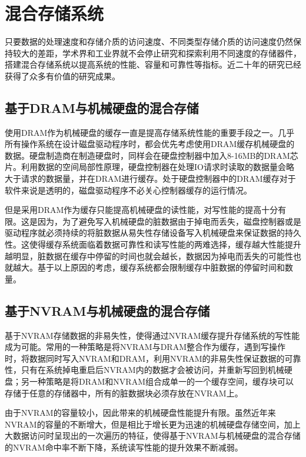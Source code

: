 \section{混合存储系统}
\label{sec:hybrid_storage}

只要数据的处理速度和存储介质的访问速度、不同类型存储介质的访问速度仍然保持较大的差距，学术界和工业界就不会停止研究和探索利用不同速度的存储器件，搭建混合存储系统以提高系统的性能、容量和可靠性等指标。近二十年的研究已经获得了众多有价值的研究成果。

\subsection{基于DRAM与机械硬盘的混合存储}

使用DRAM作为机械硬盘的缓存一直是提高存储系统性能的重要手段之一。几乎所有操作系统在设计磁盘驱动程序时，都会优先考虑使用DRAM缓存机械硬盘的数据。硬盘制造商在制造硬盘时，同样会在硬盘控制器中加入8-16MB的DRAM芯片。利用数据的空间局部性原理，硬盘控制器在处理IO请求时读取的数据量会略大于请求的数据量，并在DRAM进行缓存。处于硬盘控制器中的DRAM缓存对于软件来说是透明的，磁盘驱动程序不必关心控制器缓存的运行情况。

但是采用DRAM作为缓存只能提高机械硬盘的读性能，对写性能的提高十分有限。这是因为，为了避免写入机械硬盘的脏数据由于掉电而丢失，磁盘控制器或是驱动程序就必须持续的将脏数据从易失性存储设备写入机械硬盘来保证数据的持久性。这使得缓存系统面临着数据可靠性和读写性能的两难选择，缓存越大性能提升越明显，脏数据在缓存中停留的时间也就会越长，数据因为掉电而丢失的可能性也就越大。基于以上原因的考虑，缓存系统都会限制缓存中脏数据的停留时间和数量。

\subsection{基于NVRAM与机械硬盘的混合存储}

基于NVRAM存储数据的非易失性，使得通过NVRAM缓存提升存储系统的写性能成为可能。常用的一种策略是将NVRAM与DRAM整合作为缓存，遇到写操作时，将数据同时写入NVRAM和DRAM，利用NVRAM的非易失性保证数据的可靠性，只有在系统掉电重启后NVRAM内的数据才会被访问，并重新写回到机械硬盘；另一种策略是将DRAM和NVRAM组合成单一的一个缓存空间，缓存块可以存储于任意的存储器中，所有的脏数据块必须存放在NVRAM上。

由于NVRAM的容量较小，因此带来的机械硬盘性能提升有限。虽然近年来NVRAM的容量的不断增大，但是相比于增长更为迅速的机械硬盘存储空间，加上大数据访问时呈现出的一次遍历的特征，使得基于NVRAM与机械硬盘的混合存储的NVRAM命中率不断下降，系统读写性能的提升效果不断减弱。

